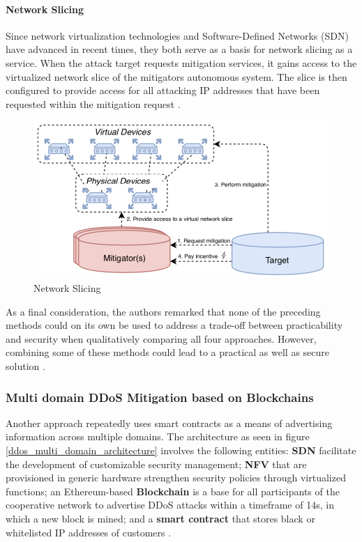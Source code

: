 \paragraph{Network Slicing}
Since network virtualization technologies and Software-Defined Networks (SDN) have advanced in recent times, they both serve as a basis for network slicing as a service. When the attack target requests mitigation services, it gains access to the virtualized network slice of the mitigators autonomous system. The slice is then configured to provide access for all attacking IP addresses that have been requested within the mitigation request \cite{Mannhart2018}.
\begin{figure}[ht]
  \begin{center}
    \includegraphics[scale=0.5]{Talk7/img/ddos/cooperative_network_network_slicing}
  \end{center}
  \caption{Network Slicing}
  \label{ddos_network_slicing}
\end{figure}

As a final consideration, the authors remarked that none of the preceding methods could on its own be used to address a trade-off between practicability and security when qualitatively comparing all four approaches. However, combining some of these methods could lead to a practical as well as secure solution \cite{Mannhart2018}.

\subsubsection{Multi domain DDoS Mitigation based on Blockchains}
Another approach repeatedly uses smart contracts as a means of advertising information across multiple domains. The architecture as seen in figure \ref{ddos_multi_domain_architecture} involves the following entities: \textbf{SDN} facilitate the development of customizable security management; \textbf{NFV} that are provisioned in generic hardware strengthen security policies through virtualized functions; an Ethereum-based \textbf{Blockchain} is a base for all participants of the cooperative network to advertise DDoS attacks within a timeframe of 14s, in which a new block is mined; and a \textbf{smart contract} that stores black or whitelisted IP addresses of customers \cite{Rodrigues2017}.


